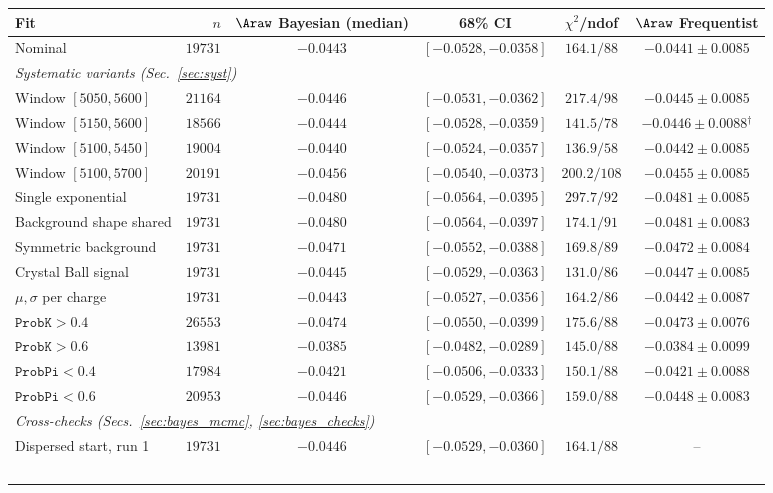 \begin{table}[t]
\centering
\begin{tabular}{lrccc|c}
\toprule
Fit & $n$ & $\Araw$ Bayesian (median) & 68\% CI & $\chi^2$/ndof & $\Araw$ Frequentist \\
\midrule
Nominal & $19731$ & $-0.0443$ & $[-0.0528,-0.0358]$ & $164.1/88$ & $-0.0441\pm0.0085$ \\
\multicolumn{6}{l}{\emph{Systematic variants (Sec.~\ref{sec:syst})}} \\
Window $[5050,5600]$ & $21164$ & $-0.0446$ & $[-0.0531,-0.0362]$ & $217.4/98$ & $-0.0445\pm0.0085$ \\
Window $[5150,5600]$ & $18566$ & $-0.0444$ & $[-0.0528,-0.0359]$ & $141.5/78$ & $-0.0446\pm0.0088$$^\dagger$ \\
Window $[5100,5450]$ & $19004$ & $-0.0440$ & $[-0.0524,-0.0357]$ & $136.9/58$ & $-0.0442\pm0.0085$ \\
Window $[5100,5700]$ & $20191$ & $-0.0456$ & $[-0.0540,-0.0373]$ & $200.2/108$ & $-0.0455\pm0.0085$ \\
Single exponential & $19731$ & $-0.0480$ & $[-0.0564,-0.0395]$ & $297.7/92$ & $-0.0481\pm0.0085$ \\
Background shape shared & $19731$ & $-0.0480$ & $[-0.0564,-0.0397]$ & $174.1/91$ & $-0.0481\pm0.0083$ \\
Symmetric background & $19731$ & $-0.0471$ & $[-0.0552,-0.0388]$ & $169.8/89$ & $-0.0472\pm0.0084$ \\
Crystal Ball signal & $19731$ & $-0.0445$ & $[-0.0529,-0.0363]$ & $131.0/86$ & $-0.0447\pm0.0085$ \\
$\mu,\sigma$ per charge & $19731$ & $-0.0443$ & $[-0.0527,-0.0356]$ & $164.2/86$ & $-0.0442\pm0.0087$ \\
$\texttt{ProbK}>0.4$ & $26553$ & $-0.0474$ & $[-0.0550,-0.0399]$ & $175.6/88$ & $-0.0473\pm0.0076$ \\
$\texttt{ProbK}>0.6$ & $13981$ & $-0.0385$ & $[-0.0482,-0.0289]$ & $145.0/88$ & $-0.0384\pm0.0099$ \\
$\texttt{ProbPi}<0.4$ & $17984$ & $-0.0421$ & $[-0.0506,-0.0333]$ & $150.1/88$ & $-0.0421\pm0.0088$ \\
$\texttt{ProbPi}<0.6$ & $20953$ & $-0.0446$ & $[-0.0529,-0.0366]$ & $159.0/88$ & $-0.0448\pm0.0083$ \\
\multicolumn{6}{l}{\emph{Cross-checks (Secs.~\ref{sec:bayes_mcmc}, \ref{sec:bayes_checks})}} \\
Dispersed start, run 1 & $19731$ & $-0.0446$ & $[-0.0529,-0.0360]$ & $164.1/88$ & -- \\
$$
\end{tabular}
\end{table}
